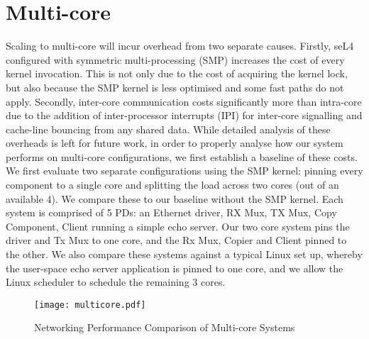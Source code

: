 \section{Multi-core}

Scaling to multi-core will incur overhead from two separate causes. Firstly, seL4 configured with symmetric multi-processing (SMP) increases
the cost of every kernel invocation. This is not only due to the cost of acquiring the kernel lock, but also because the SMP kernel is
less optimised and some fast paths do not apply. Secondly, inter-core communication costs significantly more than intra-core due to the addition of 
inter-processor interrupts (IPI) for inter-core signalling and cache-line bouncing from any shared data. While detailed analysis of these overheads is left for future work, in order to properly
analyse how our system performs on multi-core configurations, we first establish a baseline of these costs. We first evaluate two separate configurations
using the SMP kernel: pinning every component to a single core and splitting the load across two cores (out of an available 4). 
We compare these to our baseline without the SMP kernel. Each system is comprised of 5 PDs: an Ethernet driver, RX Mux, 
TX Mux, Copy Component, Client running a simple echo server. Our two core system pins the driver and Tx Mux to one core, and 
the Rx Mux, Copier and Client pinned to the other. We also compare these systems against a typical Linux set up, whereby
the user-space echo server application is pinned to one core, and we allow the Linux scheduler to schedule the remaining 3 cores.\\ 

\begin{figure}[H]
    \centering
    \texttt{[image: multicore.pdf]}
    \caption{Networking Performance Comparison of Multi-core Systems}
    \label{f:multicore}
\end{figure}

